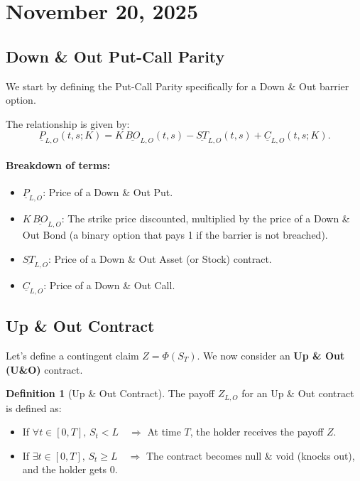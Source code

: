 \documentclass[12pt,a4paper]{article}
\theoremstyle{definition}
\newtheorem{definition}{Definition}[section]
\begin{document}
\newpage
\section{November 20, 2025}

\subsection{Down \& Out Put-Call Parity}

We start by defining the Put-Call Parity specifically for a Down \& Out barrier option.

The relationship is given by:
\[
\underline{P}_{L,O}(t, s; K) = K\, \underline{BO}_{L,O}(t, s) - \underline{ST}_{L,O}(t, s) + \underline{C}_{L,O}(t, s; K).
\]

\paragraph{Breakdown of terms:}
\begin{itemize}
\item $\underline{P}_{L,O}$: Price of a Down \& Out Put.
\item $K\, \underline{BO}_{L,O}$: The strike price discounted, multiplied by the price of a Down \& Out Bond (a binary option that pays 1 if the barrier is not breached).
\item $\underline{ST}_{L,O}$: Price of a Down \& Out Asset (or Stock) contract.
\item $\underline{C}_{L,O}$: Price of a Down \& Out Call.
\end{itemize}

\subsection{Up \& Out Contract}

Let's define a contingent claim $Z = \Phi(S_T)$. We now consider an \textbf{Up \& Out (U\&O)} contract.

\begin{definition}[Up \& Out Contract]
The payoff $Z_{L,O}$ for an Up \& Out contract is defined as:
\begin{itemize}
\item If $\forall t \in [0,T],\, S_t < L \quad \Longrightarrow$ At time $T$, the holder receives the payoff $Z$.
\item If $\exists t \in [0,T],\, S_t \geq L \quad \Longrightarrow$ The contract becomes null \& void (knocks out), and the holder gets $0$.
\end{itemize}
\end{definition}
\end{document}
